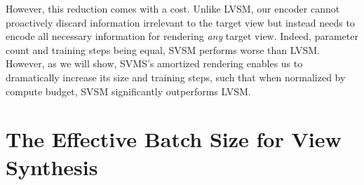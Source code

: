 
However, this reduction comes with a cost. Unlike LVSM, our encoder cannot proactively discard information irrelevant to the target view but instead needs to encode all necessary information for rendering \emph{any} target view. Indeed, parameter count and training steps being equal, SVSM performs worse than LVSM. However, as we will show, SVMS’s amortized rendering enables us to dramatically increase its size and training steps, such that when normalized by compute budget, SVSM significantly outperforms LVSM.






\section{The Effective Batch Size for View Synthesis}
\label{sec:effective-batch}

